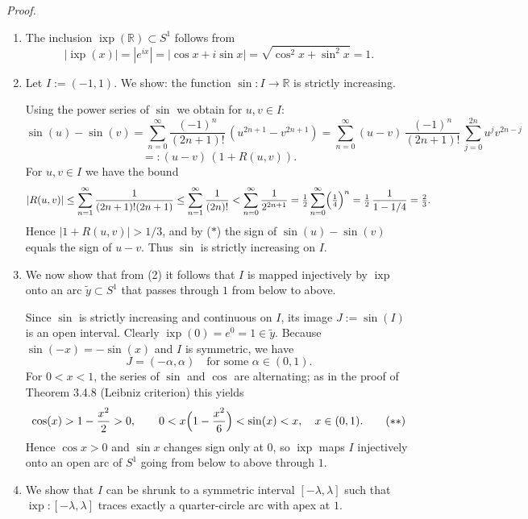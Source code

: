 \documentclass[12pt]{article}
\begin{document}
	\emph{Proof.}
	\begin{enumerate}[label=({\arabic*})]
		\item The inclusion $\operatorname{ixp}(\mathbb R) \subset S^{1}$ follows from
		\[
			|\operatorname{ixp}(x)| = |e^{ix}| = |\cos x + i\sin x| = \sqrt{\cos^{2}x + \sin^{2}x} = 1.
		\]
		\item Let $I := (-1,1)$. We show: the function $\sin : I \to \mathbb R$ is strictly increasing.

		Using the power series of $\sin$ we obtain for $u,v\in I$:
		\[
			\sin(u) - \sin(v)
				= \sum_{n=0}^{\infty} \frac{(-1)^n}{(2n+1)!}\,(u^{2n+1}-v^{2n+1})
				= \sum_{n=0}^{\infty} (u-v)\,\frac{(-1)^n}{(2n+1)!}\,\sum_{j=0}^{2n} u^{j} v^{2n-j} \]
		\[		=: (u-v)\,(1+R(u,v)). \tag{$*$}
		\]
		For $u,v\in I$ we have the bound
		\[
			|R(u,v)| \le \sum_{n=1}^{\infty} \frac{1}{(2n+1)!(2n+1)}
				\le \sum_{n=1}^{\infty} \frac{1}{(2n)!}
				< \sum_{n=0}^{\infty} \frac{1}{2^{2n+1}}
				= \tfrac{1}{2} \sum_{n=0}^{\infty} \Bigl(\tfrac{1}{4}\Bigr)^{n}
				= \tfrac{1}{2}\,\frac{1}{1-1/4} = \tfrac{2}{3}.
		\]
		Hence $|1+R(u,v)| > 1/3$, and by ($*$) the sign of $\sin(u)-\sin(v)$ equals the sign of $u-v$. Thus $\sin$ is strictly increasing on $I$.

		\item We now show that from (2) it follows that $I$ is mapped injectively by $\operatorname{ixp}$ onto an arc $\tilde y \subset S^{1}$ that passes through $1$ from below to above.

		Since $\sin$ is strictly increasing and continuous on $I$, its image $J := \sin(I)$ is an open interval. Clearly $\operatorname{ixp}(0) = e^{0} = 1 \in \tilde y$. Because $\sin(-x) = -\sin(x)$ and $I$ is symmetric, we have
		\[
			J = (-\alpha,\alpha) \quad \text{for some } \alpha \in (0,1).
		\]
		For $0<x<1$, the series of $\sin$ and $\cos$ are alternating; as in the proof of Theorem 3.4.8 (Leibniz criterion) this yields
		\[
			\cos(x) > 1 - \frac{x^{2}}{2} > 0,
			\qquad 0 < x\Bigl(1 - \frac{x^{2}}{6}\Bigr) < \sin(x) < x, \quad x\in(0,1). \tag{$**$}
		\]
		Hence $\cos x>0$ and $\sin x$ changes sign only at $0$, so $\operatorname{ixp}$ maps $I$ injectively onto an open arc of $S^{1}$ going from below to above through $1$.

		\item We show that $I$ can be shrunk to a symmetric interval $[-\lambda,\lambda]$ such that $\operatorname{ixp}:[-\lambda,\lambda]$ traces exactly a quarter-circle arc with apex at $1$.


\end{enumerate}
\end{document}
